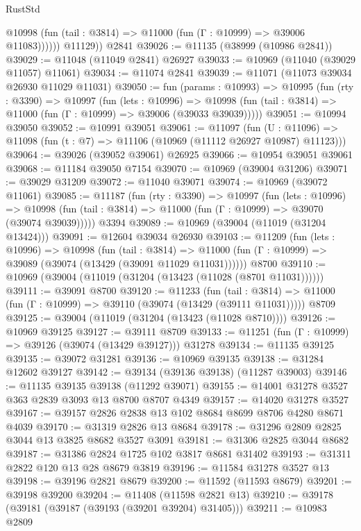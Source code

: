 \begin{lexlean}{RustStd}
\begin{coremodule}
              @10998 (fun (tail : @3814) => @11000 (fun (Γ : @10999) => @39006 @11083))))))
        @11129))
    @2841
@39026 := @11135 (@38999 (@10986 @2841))
@39029 := @11048 (@11049 @2841) @26927
@39033 := @10969 (@11040 (@39029 @11057) @11061)
@39034 := @11074 @2841
@39039 := @11071 (@11073 @39034 @26930 @11029 @11031)
@39050 := fun (params : @10993) =>
  @10995
    (fun (rty : @3390) =>
    @10997
      (fun (lets : @10996) =>
      @10998 (fun (tail : @3814) => @11000 (fun (Γ : @10999) => @39006 (@39033 @39039)))))
@39051 := @10994 @39050
@39052 := @10991 @39051
@39061 := @11097
    (fun (U : @11096) => @11098 (fun (t : @7) => @11106 (@10969 (@11112 @26927 @10987) @11123)))
@39064 := @39026 (@39052 @39061) @26925
@39066 := @10954 @39051 @39061
@39068 := @11184 @39050 @7154
@39070 := @10969 (@39004 @31206)
@39071 := @39029 @31209
@39072 := @11040 @39071
@39074 := @10969 (@39072 @11061)
@39085 := @11187
    (fun (rty : @3390) =>
    @10997
      (fun (lets : @10996) =>
      @10998 (fun (tail : @3814) => @11000 (fun (Γ : @10999) => @39070 (@39074 @39039)))))
    @3394
@39089 := @10969 (@39004 (@11019 (@31204 @13424)))
@39091 := @12604 @39034 @26930
@39103 := @11209
    (fun (lets : @10996) =>
    @10998
      (fun (tail : @3814) =>
      @11000 (fun (Γ : @10999) => @39089 (@39074 (@13429 (@39091 @11029 @11031))))))
    @8700
@39110 := @10969 (@39004 (@11019 (@31204 (@13423 (@11028 (@8701 @11031))))))
@39111 := @39091 @8700
@39120 := @11233
    (fun (tail : @3814) => @11000 (fun (Γ : @10999) => @39110 (@39074 (@13429 (@39111 @11031)))))
    @8709
@39125 := @39004 (@11019 (@31204 (@13423 (@11028 @8710))))
@39126 := @10969 @39125
@39127 := @39111 @8709
@39133 := @11251 (fun (Γ : @10999) => @39126 (@39074 (@13429 @39127))) @31278
@39134 := @11135 @39125
@39135 := @39072 @31281
@39136 := @10969 @39135
@39138 := @31284 @12602 @39127
@39142 := @39134 (@39136 @39138) (@11287 @39003)
@39146 := @11135 @39135 @39138 (@11292 @39071)
@39155 := @14001 @31278 @3527 @363 @2839 @3093 @13 @8700 @8707 @4349
@39157 := @14020 @31278 @3527
@39167 := @39157 @2826 @2838 @13 @102 @8684 @8699 @8706 @4280 @8671 @4039
@39170 := @31319 @2826 @13 @8684
@39178 := @31296 @2809 @2825 @3044 @13 @3825 @8682 @3527 @3091
@39181 := @31306 @2825 @3044 @8682
@39187 := @31386 @2824 @1725 @102 @3817 @8681 @31402
@39193 := @31311 @2822 @120 @13 @28 @8679 @3819
@39196 := @11584 @31278 @3527 @13
@39198 := @39196 @2821 @8679
@39200 := @11592 (@11593 @8679)
@39201 := @39198 @39200
@39204 := @11408 (@11598 @2821 @13)
@39210 := @39178 (@39181 (@39187 (@39193 (@39201 @39204) @31405)))
@39211 := @10983 @2809

\end{coremodule}
\end{lexlean}
